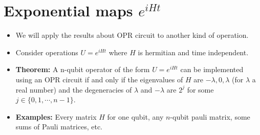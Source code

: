 \section{Exponential maps $e^{iHt}$}
\begin{itemize}
\item We will apply the results about OPR circuit to another kind of operation.
\item Consider operations $U  = e^{iHt}$ where $H$ is hermitian  and time independent.
\item \textbf{Theorem:} A n-qubit operator of the form $U = e^{iHt}$ can be implemented using an OPR circuit if and only if the eigenvalues of $H$ are $-\lambda,0,\lambda$ (for $\lambda$ a real number) and the degeneracies of $\lambda$ and $-\lambda$ are $2^j$ for some $j\in \{0,1,\cdots,n-1\}$.
\item \textbf{Examples:} Every matrix $H$ for one qubit, any $n$-qubit pauli matrix, some sums of Pauli matrices, etc.
\end{itemize}